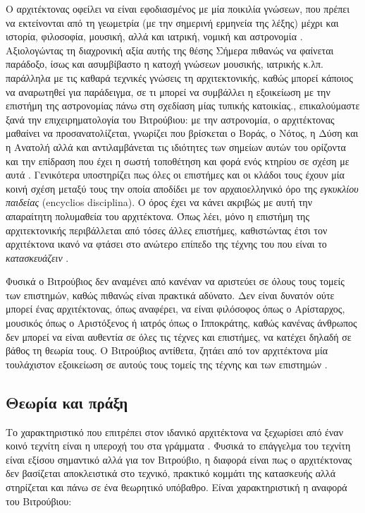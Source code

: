 Ο αρχιτέκτονας οφείλει να είναι εφοδιασμένος με μία ποικιλία γνώσεων, που 
πρέπει να εκτείνονται από τη γεωμετρία (με την σημερινή ερμηνεία της λέξης) 
μέχρι και ιστορία, φιλοσοφία, μουσική, αλλά και ιατρική, νομική και αστρονομία 
\cite[σ. 392]{masterson_status_2004}. Αξιολογώντας τη διαχρονική αξία αυτής της 
θέσης\sidenote%
    {Σήμερα πιθανώς να φαίνεται παράδοξο, ίσως και ασυμβίβαστο η   κατοχή 
    γνώσεων μουσικής, ιατρικής κ.λπ. παράλληλα με τις καθαρά τεχνικές γνώσεις 
    τη αρχιτεκτονικής, καθώς μπορεί κάποιος να αναρωτηθεί για παράδειγμα, σε τι 
    μπορεί να συμβάλλει η εξοικείωση με
    την επιστήμη της αστρονομίας πάνω στη σχεδίαση μίας
    τυπικής κατοικίας.},
επικαλούμαστε ξανά την επιχειρηματολογία του Βιτρούβιου: με την αστρονομία, ο 
αρχιτέκτονας μαθαίνει να προσανατολίζεται, γνωρίζει που βρίσκεται ο Βοράς, ο 
Νότος, η Δύση και η Ανατολή αλλά και αντιλαμβάνεται τις ιδιότητες των σημείων 
αυτών του ορίζοντα και την επίδραση που έχει η σωστή τοποθέτηση και φορά ενός 
κτηρίου σε σχέση με αυτά \cite[σ. 43]{vitruvius-lefas}. Γενικότερα υποστηρίζει 
πως όλες οι επιστήμες και οι κλάδοι τους έχουν μία κοινή σχέση μεταξύ τους την 
οποία αποδίδει με τον αρχαιοελληνικό όρο της \emph{εγκυκλίου παιδείας} 
(encyclios disciplina). Ο όρος έχει να κάνει ακριβώς με αυτή την απαραίτητη 
πολυμαθεία του αρχιτέκτονα. Όπως λέει, μόνο η επιστήμη της αρχιτεκτονικής 
περιβάλλεται από τόσες άλλες επιστήμες, καθιστώντας έτσι τον αρχιτέκτονα ικανό 
να φτάσει στο ανώτερο επίπεδο της τέχνης του που είναι το \emph{κατασκευάζειν} 
\cite[σ. 45]{vitruvius-lefas}.

Φυσικά ο Βιτρούβιος δεν αναμένει από κανέναν να αριστεύει σε όλους τους τομείς 
των επιστημών, καθώς πιθανώς είναι πρακτικά αδύνατο. Δεν είναι δυνατόν ούτε 
μπορεί ένας αρχιτέκτονας, όπως αναφέρει, να είναι φιλόσοφος όπως ο Αρίσταρχος, 
μουσικός όπως ο Αριστόξενος ή ιατρός όπως ο Ιπποκράτης, καθώς κανένας άνθρωπος 
δεν μπορεί να είναι αυθεντία σε όλες τις τέχνες και επιστήμες, να κατέχει 
δηλαδή σε βάθος τη θεωρία τους. Ο Βιτρούβιος αντίθετα, ζητάει από τον 
αρχιτέκτονα μία τουλάχιστον εξοικείωση σε αυτούς τους τομείς της τέχνης και των 
επιστημών \cite[σ.~45]{vitruvius-lefas}. 

\subsection{Θεωρία και πράξη}

Το χαρακτηριστικό που επιτρέπει στον  ιδανικό αρχιτέκτονα να ξεχωρίσει από έναν κοινό τεχνίτη είναι η υπεροχή του στα γράμματα \cite{masterson_status_2004}. Φυσικά το επάγγελμα του τεχνίτη είναι εξίσου σημαντικό αλλά για τον Βιτρούβιο, η διαφορά είναι πως ο αρχιτέκτονας δεν βασίζεται αποκλειστικά στο τεχνικό, πρακτικό κομμάτι της κατασκευής αλλά στηρίζεται και πάνω σε ένα θεωρητικό υπόβαθρο. Είναι χαρακτηριστική η αναφορά του Βιτρούβιου:

